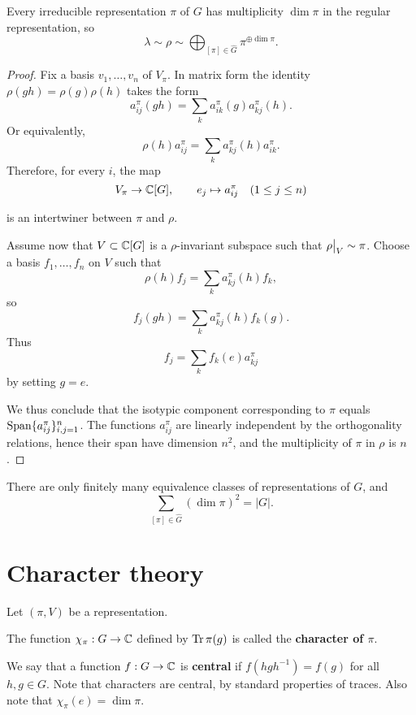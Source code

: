 \documentclass[11pt, english]{article}
\begin{document}
\begin{thm}
Every irreducible representation $\pi$ of $G$ has multiplicity $\dim \pi$ in the regular representation, so
$$
\lambda \sim \rho \sim \bigoplus_{[\pi] \in \widehat G} \pi^{\oplus \dim \pi}.
$$
\label{thmspan}
\end{thm}

\begin{proof}
Fix a basis $v_1,\ldots,v_n$ of $V_\pi$. In matrix form the identity $\rho(gh)=\rho(g)\rho(h)$ takes the form 
$$
a_{ij}^\pi(gh) = \sum_k a_{ik}^\pi(g) a_{kj}^\pi (h). 
$$
Or equivalently,
$$
\rho(h) a_{ij}^\pi  = 	\sum_k a_{kj}^\pi (h) a_{ik}^\pi.
$$
Therefore, for every $i$, the map 
$$
V_\pi \to \mathbb{C}[G], \qquad e_j \mapsto a_{ij}^\pi  \quad (1 \leq j \leq n)
$$

is an intertwiner between $\pi$ and $\rho$.

Assume now that $V \subset \mathbb{C}[G]$ is a $\rho$-invariant subspace such that $\restr{\rho}{V} \sim \pi$. Choose a basis $f_1,\ldots, f_n$ on $V$ such that 
$$
\rho(h) f_j = \sum_k a_{kj}^\pi(h) f_k,
$$
so 
$$
f_j(gh) = \sum_k a_{kj}^\pi(h) f_k(g).
$$
Thus
$$
f_j = \sum_k f_k(e) a_{kj}^\pi
$$
by setting $g=e$.

We thus conclude that the isotypic component corresponding to $\pi$ equals $\operatorname{Span} \{ a_{ij}^\pi \}_{i,j=1}^n$. The functions $a_{ij}^\pi$ are linearly independent by the orthogonality relations, hence their span have dimension $n^2$, and the multiplicity of $\pi$ in $\rho$ is $n$.
\end{proof}

\begin{corr}
There are only finitely many equivalence classes of representations of $G$, and 
$$
\sum_{[\pi] \in \widehat G} (\dim \pi )^2 = \lvert G \rvert.
$$
\end{corr}



\newpage
\section{Character theory}

Let $(\pi,V)$ be a representation. 

The function $\chi_\pi:G \to \mathbb{C}$ defined by $\operatorname{Tr} \pi(g)$ is called the \textbf{character of $\pi$}.

We say that a function $f:G \to \mathbb{C}$ is \textbf{central} if $f(hgh^{-1})=f(g)$ for all $h,g \in G$. Note that characters are central, by standard properties of traces. Also note that $\chi_\pi(e)=\dim \pi$. 
\end{document}
